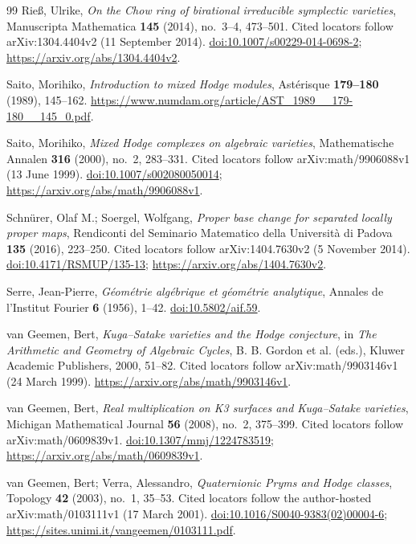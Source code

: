 \documentclass[11pt]{amsart}
\theoremstyle{definition}
\theoremstyle{remark}
\numberwithin{equation}{section}
\begin{document}
\begin{thebibliography}{99}
Rie\ss, Ulrike, \emph{On the Chow ring of birational irreducible symplectic varieties}, Manuscripta Mathematica \textbf{145} (2014), no.~3--4, 473--501. Cited locators follow arXiv:1304.4404v2 (11 September 2014). \href{https://doi.org/10.1007/s00229-014-0698-2}{doi:10.1007/s00229-014-0698-2}; \url{https://arxiv.org/abs/1304.4404v2}.

Saito, Morihiko, \emph{Introduction to mixed Hodge modules}, Ast{\'e}risque \textbf{179--180} (1989), 145--162. \url{https://www.numdam.org/article/AST_1989__179-180__145_0.pdf}.

Saito, Morihiko, \emph{Mixed Hodge complexes on algebraic varieties}, Mathematische Annalen \textbf{316} (2000), no.~2, 283--331. Cited locators follow arXiv:math/9906088v1 (13 June 1999). \href{https://doi.org/10.1007/s002080050014}{doi:10.1007/s002080050014}; \url{https://arxiv.org/abs/math/9906088v1}.

Schn{\"u}rer, Olaf M.; Soergel, Wolfgang, \emph{Proper base change for separated locally proper maps}, Rendiconti del Seminario Matematico della Universit{\`a} di Padova \textbf{135} (2016), 223--250. Cited locators follow arXiv:1404.7630v2 (5 November 2014). \href{https://doi.org/10.4171/RSMUP/135-13}{doi:10.4171/RSMUP/135-13}; \url{https://arxiv.org/abs/1404.7630v2}.

Serre, Jean-Pierre, \emph{G{\'e}om{\'e}trie alg{\'e}brique et g{\'e}om{\'e}trie analytique}, Annales de l'Institut Fourier \textbf{6} (1956), 1--42. \href{https://doi.org/10.5802/aif.59}{doi:10.5802/aif.59}.

van Geemen, Bert, \emph{Kuga--Satake varieties and the Hodge conjecture}, in \emph{The Arithmetic and Geometry of Algebraic Cycles}, B. B. Gordon et al. (eds.), Kluwer Academic Publishers, 2000, 51--82. Cited locators follow arXiv:math/9903146v1 (24 March 1999). \url{https://arxiv.org/abs/math/9903146v1}.

van Geemen, Bert, \emph{Real multiplication on K3 surfaces and Kuga--Satake varieties}, Michigan Mathematical Journal \textbf{56} (2008), no.~2, 375--399. Cited locators follow arXiv:math/0609839v1. \href{https://doi.org/10.1307/mmj/1224783519}{doi:10.1307/mmj/1224783519}; \url{https://arxiv.org/abs/math/0609839v1}.

van Geemen, Bert; Verra, Alessandro, \emph{Quaternionic {Pryms} and {Hodge} classes}, Topology \textbf{42} (2003), no.~1, 35--53. Cited locators follow the author-hosted arXiv:math/0103111v1 (17 March 2001). \href{https://doi.org/10.1016/S0040-9383(02)00004-6}{doi:10.1016/S0040-9383(02)00004-6}; \url{https://sites.unimi.it/vangeemen/0103111.pdf}.


\end{thebibliography}
\end{document}
